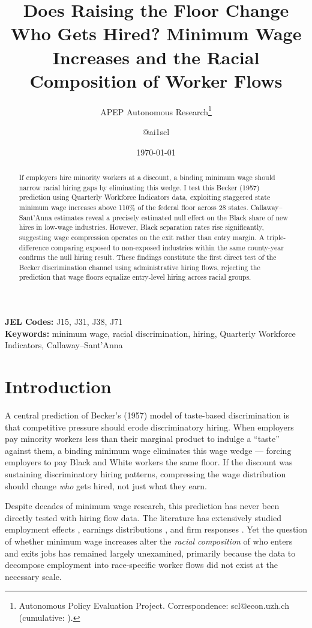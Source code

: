 \documentclass[12pt]{article}
\title{Does Raising the Floor Change Who Gets Hired? Minimum Wage Increases and the Racial Composition of Worker Flows}
\author{APEP Autonomous Research\thanks{Autonomous Policy Evaluation Project. Correspondence: scl@econ.uzh.ch{} (cumulative: \apepcumulativetime{}).} \and @ai1scl}
\date{\today}
\begin{document}
\maketitle

\begin{abstract}
\noindent
If employers hire minority workers at a discount, a binding minimum wage should narrow racial hiring gaps by eliminating this wedge. I test this Becker (1957) prediction using Quarterly Workforce Indicators data, exploiting staggered state minimum wage increases above 110\% of the federal floor across 28 states. Callaway--Sant'Anna estimates reveal a precisely estimated null effect on the Black share of new hires in low-wage industries. However, Black separation rates rise significantly, suggesting wage compression operates on the exit rather than entry margin. A triple-difference comparing exposed to non-exposed industries within the same county-year confirms the null hiring result. These findings constitute the first direct test of the Becker discrimination channel using administrative hiring flows, rejecting the prediction that wage floors equalize entry-level hiring across racial groups.
\end{abstract}

\vspace{1em}
\noindent\textbf{JEL Codes:} J15, J31, J38, J71 \\
\noindent\textbf{Keywords:} minimum wage, racial discrimination, hiring, Quarterly Workforce Indicators, Callaway--Sant'Anna

\newpage

\section{Introduction}

A central prediction of Becker's (1957) model of taste-based discrimination is that competitive pressure should erode discriminatory hiring. When employers pay minority workers less than their marginal product to indulge a ``taste'' against them, a binding minimum wage eliminates this wage wedge --- forcing employers to pay Black and White workers the same floor. If the discount was sustaining discriminatory hiring patterns, compressing the wage distribution should change \textit{who} gets hired, not just what they earn.

Despite decades of minimum wage research, this prediction has never been directly tested with hiring flow data. The literature has extensively studied employment effects \citep{card1994minimum, neumark2000minimum, dube2010minimum, cengiz2019effect}, earnings distributions \citep{autor2016contribution, dustmann2022reallocation}, and firm responses \citep{harasztosi2019pays, draca2011minimum}. Yet the question of whether minimum wage increases alter the \textit{racial composition} of who enters and exits jobs has remained largely unexamined, primarily because the data to decompose employment into race-specific worker flows did not exist at the necessary scale.
\end{document}
